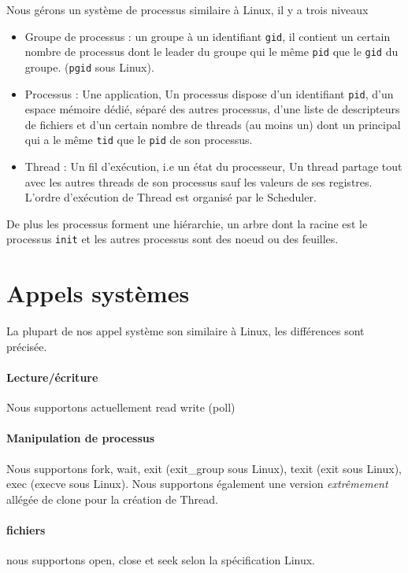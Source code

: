 \documentclass[12pt]{report}
\begin{document}
Nous gérons un système de processus similaire à Linux, il y a trois niveaux
\begin{itemize}
\item Groupe de processus : un groupe à un identifiant \verb$gid$, il contient
  un certain nombre de processus dont le leader du groupe qui le même \verb$pid$
  que le \verb$gid$ du groupe. (\verb$pgid$ sous Linux).
\item Processus : Une application, Un processus dispose d'un identifiant
  \verb$pid$, d'un espace mémoire dédié, séparé des autres processus, d'une
  liste de descripteurs de fichiers et d'un certain nombre de threads (au moins
  un) dont un principal qui a le même \verb$tid$ que le \verb$pid$ de son processus. 
\item Thread : Un \og fil \fg{} d'exécution, i.e un état du processeur, Un
  thread partage tout avec les autres threads de son processus sauf les valeurs
  de ses registres. L'ordre d'exécution de Thread est organisé par le Scheduler. 
\end{itemize}

De plus les processus forment une hiérarchie, un arbre dont la racine est le
processus \verb$init$ et les autres processus sont des noeud ou des feuilles.

\section{Appels systèmes}

La plupart de nos appel système son similaire à Linux, les différences sont précisée.

\paragraph{Lecture/écriture}

Nous supportons actuellement read write  (poll)

\paragraph{Manipulation de processus} Nous supportons fork, wait, exit (exit\_group sous Linux),
texit (exit sous Linux), exec (execve sous Linux). Nous supportons également une
version \textit{extrêmement} allégée de clone pour la création de Thread.

\paragraph{fichiers} nous supportons open, close et seek selon la spécification Linux.
\end{document}
